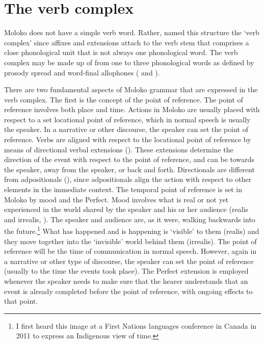 \chapter[The verb complex]{The verb complex}\label{chap:7}
\hypertarget{RefHeading1212081525720847}{}
Moloko does not have a simple verb word. Rather, \citet{FriesenMamalis2008} named this structure the ‘verb complex’ since affixes and extensions attach to the verb stem that comprises a close phonological unit that is not always one phonological word. The verb complex may be made up of from one to three phonological words as defined by prosody spread and word-final allophones ( and ). 

There are two fundamental aspects of Moloko grammar that are expressed in the verb complex. The first is the concept of the point of reference. The point of reference involves both place and time. Actions in Moloko are usually placed with respect to a set locational point of reference, which in normal speech is usually the speaker. In a narrative or other discourse, the speaker can set the point of reference. Verbs are aligned with respect to the locational point of reference by means of directional verbal extensions (). These extensions determine the direction of the event with respect to the point of reference, and can be towards the speaker, away from the speaker, or back and forth. Directionals are different from adpositionals (), since adpositionals align the action with respect to other elements in the immediate context. The temporal point of reference is set in Moloko by mood and the Perfect. Mood involves what is real or not yet experienced in the world shared by the speaker and his or her audience (realis and irrealis, ). The speaker and audience are, as it were, walking backwards into the future.\footnote{I first heard this image at a First Nations languages conference in Canada in 2011 to express an Indigenous view of time. } What has happened and is happening is ‘visible’ to them (realis) and they move together into the ‘invisible’ world behind them (irrealis). The point of reference will be the time of communication in normal speech. However, again in a narrative or other type of discourse, the speaker can set the point of reference (usually to the time the events took place). The Perfect extension is employed whenever the speaker needs to make sure that the hearer understands that an event is already completed before the point of reference, with ongoing effects to that point. 

